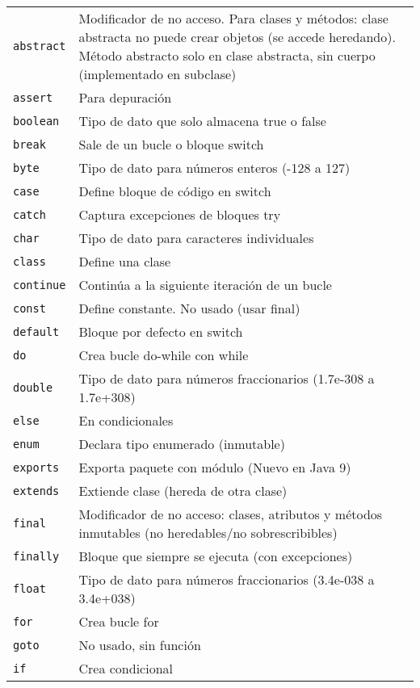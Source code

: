 \documentclass[12pt]{article}
\theoremstyle{largebreak}
\begin{document}
\begin{longtable}{l p{}}
    \lstinline|abstract| & Modificador de no acceso. Para clases y métodos: clase abstracta no puede crear objetos (se accede heredando). Método abstracto solo en clase abstracta, sin cuerpo (implementado en subclase) \\
    \lstinline|assert| & Para depuración \\
    \lstinline|boolean| & Tipo de dato que solo almacena true o false \\
    \lstinline|break| & Sale de un bucle o bloque switch \\
    \lstinline|byte| & Tipo de dato para números enteros (-128 a 127) \\
    \lstinline|case| & Define bloque de código en switch \\
    \lstinline|catch| & Captura excepciones de bloques try \\
    \lstinline|char| & Tipo de dato para caracteres individuales \\
    \lstinline|class| & Define una clase \\
    \lstinline|continue| & Continúa a la siguiente iteración de un bucle \\
    \lstinline|const| & Define constante. No usado (usar final) \\
    \lstinline|default| & Bloque por defecto en switch \\
    \lstinline|do| & Crea bucle do-while con while \\
    \lstinline|double| & Tipo de dato para números fraccionarios (1.7e-308 a 1.7e+308) \\
    \lstinline|else| & En condicionales \\
    \lstinline|enum| & Declara tipo enumerado (inmutable) \\
    \lstinline|exports| & Exporta paquete con módulo (Nuevo en Java 9) \\
    \lstinline|extends| & Extiende clase (hereda de otra clase) \\
    \lstinline|final| & Modificador de no acceso: clases, atributos y métodos inmutables (no heredables/no sobrescribibles) \\
    \lstinline|finally| & Bloque que siempre se ejecuta (con excepciones) \\
    \lstinline|float| & Tipo de dato para números fraccionarios (3.4e-038 a 3.4e+038) \\
    \lstinline|for| & Crea bucle for \\
    \lstinline|goto| & No usado, sin función \\
    \lstinline|if| & Crea condicional \\

\end{longtable}
\end{document}

